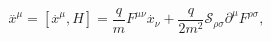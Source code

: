 \begin{equation}
\stackrel{..}{x}^{\mu }=\left[ \stackrel{.}{x}^{\mu },H\right] =\frac{q}{m}%
F^{\mu \nu }\stackrel{.}{x}_{\nu }+\frac{q}{2m^{2}}\mathcal{S}_{\rho \sigma
}\partial ^{\mu }F^{\rho \sigma },
\end{equation}

